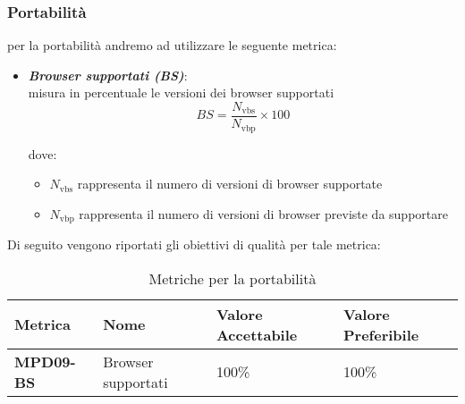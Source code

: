\subsubsection{Portabilità}
per la portabilità andremo ad utilizzare le seguente metrica:
\begin{itemize}
    \item \textbf{\emph{Browser supportati (BS)}}:\\
    misura in percentuale le versioni dei browser supportati
    \[
    BS = \frac{N_{\text{vbs}}}{N_{\text{vbp}}} \times 100
    \]

    dove:
    \begin{itemize}
        \item \(N_{\text{vbs}}\) rappresenta il numero di versioni di browser supportate
        \item \(N_{\text{vbp}}\) rappresenta il numero di versioni di browser previste da supportare
    \end{itemize}
\end{itemize}
Di seguito vengono riportati gli obiettivi di qualità per tale metrica:
\begin{table}[htbp]
    \centering
    \begin{tabular}{|>{\centering\arraybackslash}p{4cm}|p{4cm}|p{4cm}|p{4cm}|}
    \hline
    \rowcolor{gray!30}
    \textbf{Metrica} & \textbf{Nome} & \textbf{Valore Accettabile} & \textbf{Valore Preferibile} \\
    \hline
    \rowcolor{gray!10}
    \textbf{MPD09-BS} & Browser supportati & 100\% & 100\% \\
    \hline
    \end{tabular}
    \caption{Metriche per la portabilità}
    \label{tab:metriche_portabilita}
\end{table}